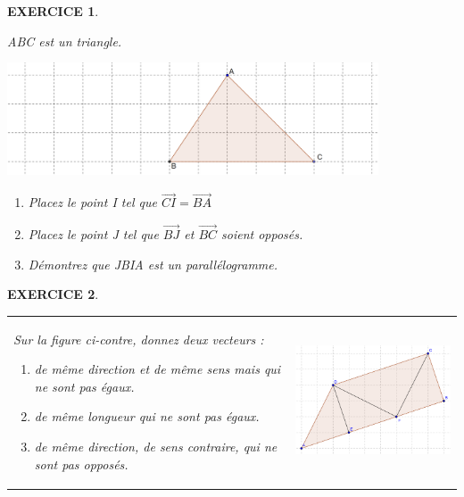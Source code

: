 \documentclass[a4paper]{article}   %
\renewcommand{\(}{\left(}
\renewcommand{\)}{\right)}
\newtheorem{EXO}{\large EXERCICE }
\newenvironment{EX}   { \setcounter{ques}{0} \begin{EXO} \hrulefill ~\vspace{0.3cm}

\normalfont}    {\end{EXO} \medskip}
\def\v{\overrightarrow}	%
\begin{document}
\begin{center} 	
\end{center}

\begin{EX} 
ABC est un triangle. 
\begin{center}
\includegraphics[width=11cm]{8ex1.png}
\end{center}
\begin{enumerate}
\item Placez le point I tel que $\v{CI}=\v{BA} $
\item Placez le point J tel que $\v{BJ}$ et $\v{BC}$ soient opposés.
\item Démontrez que JBIA est un parallélogramme.
\end{enumerate} 
\end{EX}

\begin{EX} 
\renewcommand{\tabularxcolumn}[1]{b{#1}}
\begin{tabularx}{\linewidth}{Xc}	
Sur la figure ci-contre, donnez deux vecteurs :

\begin{enumerate}
\item de même direction et de même sens mais qui ne sont pas égaux.
\item de même longueur qui ne sont pas égaux.
\item de même direction, de sens contraire, qui ne sont pas opposés.
\end{enumerate}
&
\includegraphics[width=7cm]{8ex2.png} \\
\end{tabularx}

\end{EX}
\end{document}
